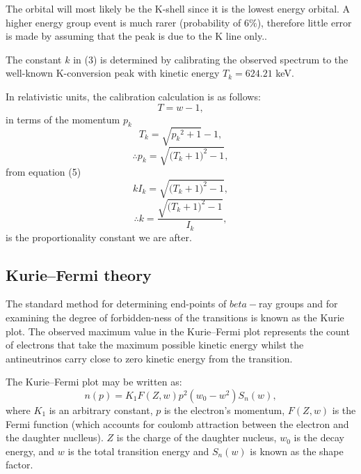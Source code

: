 \documentclass[10pt, a4paper]{article}
\begin{document}
\begin{multicols}{2}
The orbital will most likely be the K-shell since it is the lowest energy orbital. A higher energy group event is much rarer (probability of $6\%$), therefore little error is made  by assuming that the peak is due to the K line only.\cite{SPA}.

The constant $k$ in (3) is determined by calibrating the observed spectrum to the well-known K-conversion peak with kinetic energy $T_k = 624.21$ keV.
 
In relativistic units, the calibration calculation is as follows:
\begin{equation}T = w - 1,
\end{equation}
in terms of the momentum $p_k$
\begin{equation}T_k = \sqrt{{p_{k}}^{2} + 1} -1,
\end{equation}
\begin{equation} \therefore p_k = \sqrt{({T_{k} + 1)}^{2} - 1 },
\end{equation}
from equation (5)
\begin{equation} k I_k = \sqrt{({T_{k} + 1)}^{2} - 1 },
\end{equation}
\begin{equation} \therefore k = \frac{\sqrt{({T_{k} + 1)}^{2} - 1 }}{I_k},
\end{equation}
is the proportionality constant we are after.

\subsection{Kurie--Fermi theory}

The standard method for determining end-points of $beta-$ray groups and for examining the degree of forbidden-ness of the transitions\cite{SPA} is known as the Kurie plot. The observed maximum value in the Kurie--Fermi plot represents the count of electrons that take the maximum possible kinetic energy whilst the antineutrinos carry close to zero kinetic energy from the transition.

The Kurie--Fermi plot may be written as: 
\begin{equation} n(p) = K_1 F(Z, w) p^2(w_0 - w^2) S_n(w),
\end{equation}
where $K_1$ is an arbitrary constant, $p$ is the electron's momentum, $F(Z, w)$ is the Fermi function (which accounts for coulomb attraction between the electron and the daughter nuclleus). $Z$ is the charge of the daughter nucleus, $w_0$ is the decay energy, and $w$ is the total transition energy and $S_n(w)$ is known as the shape factor. 


\end{multicols}
\end{document}
